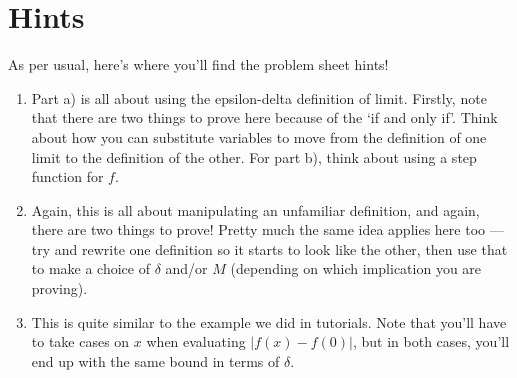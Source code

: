 \documentclass[
  17pt,
  a4paper]{extarticle}
\providecommand{\tightlist}{%
  \setlength{\itemsep}{0pt}\setlength{\parskip}{0pt}}
\theoremstyle{plain}
\theoremstyle{definition}
\theoremstyle{plain}
\theoremstyle{plain}
\theoremstyle{plain}
\theoremstyle{plain}
\theoremstyle{definition}
\theoremstyle{definition}
\theoremstyle{remark}
\theoremstyle{remark}
\renewcommand{\;}{\,}
\begin{document}
\hypertarget{hints}{%
\section{Hints}\label{hints}}

As per usual, here's where you'll find the problem sheet hints!

\begin{enumerate}
\def\labelenumi{\arabic{enumi})}
\tightlist
\item
  Part a) is all about using the epsilon-delta definition of limit. Firstly, note that there are two things to prove here because of the `if and only if'. Think about how you can substitute variables to move from the definition of one limit to the definition of the other. For part b), think about using a step function for \(f\).
\item
  Again, this is all about manipulating an unfamiliar definition, and again, there are two things to prove! Pretty much the same idea applies here too --- try and rewrite one definition so it starts to look like the other, then use that to make a choice of \(\delta\) and/or \(M\) (depending on which implication you are proving).
\item
  This is quite similar to the example we did in tutorials. Note that you'll have to take cases on \(x\) when evaluating \(\lvert f(x) - f(0)\rvert\), but in both cases, you'll end up with the same bound in terms of \(\delta\).
\end{enumerate}
\end{document}
